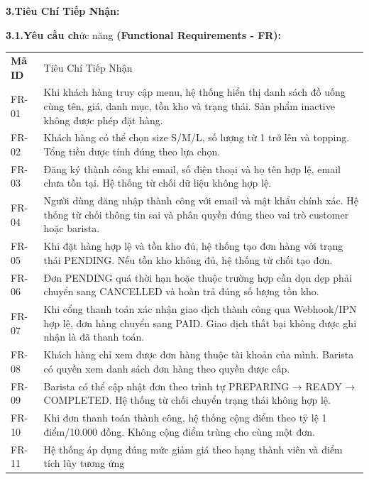 \documentclass[
]{article}
\begin{document}
\textbf{3.Tiêu Chí Tiếp Nhận:}

\textbf{3.1.Yêu cầu ch}ức năng \textbf{(Functional Requirements - FR):}

\begin{longtable}[]{@{}
  >{\raggedright\arraybackslash}p{}
  >{\raggedright\arraybackslash}p{}@{}}
\toprule\noalign{}
\endhead
\bottomrule\noalign{}
\endlastfoot
\textbf{Mã ID} & Tiêu Chí Tiếp Nhận \\
FR-01 & Khi khách hàng truy cập menu, hệ thống hiển thị danh sách đồ uống cùng tên, giá, danh mục, tồn kho và trạng thái. Sản phẩm inactive không được phép đặt hàng. \\
FR-02 & Khách hàng có thể chọn size S/M/L, số lượng từ 1 trở lên và topping. Tổng tiền được tính đúng theo lựa chọn. \\
FR-03 & Đăng ký thành công khi email, số điện thoại và họ tên hợp lệ, email chưa tồn tại. Hệ thống từ chối dữ liệu không hợp lệ. \\
FR-04 & Người dùng đăng nhập thành công với email và mật khẩu chính xác. Hệ thống từ chối thông tin sai và phân quyền đúng theo vai trò customer hoặc barista. \\
FR-05 & Khi đặt hàng hợp lệ và tồn kho đủ, hệ thống tạo đơn hàng với trạng thái PENDING. Nếu tồn kho không đủ, hệ thống từ chối tạo đơn. \\
FR-06 & Đơn PENDING quá thời hạn hoặc thuộc trường hợp cần dọn dẹp phải chuyển sang CANCELLED và hoàn trả đúng số lượng tồn kho. \\
FR-07 & Khi cổng thanh toán xác nhận giao dịch thành công qua Webhook/IPN hợp lệ, đơn hàng chuyển sang PAID. Giao dịch thất bại không được ghi nhận là đã thanh toán. \\
FR-08 & Khách hàng chỉ xem được đơn hàng thuộc tài khoản của mình. Barista có quyền xem danh sách đơn hàng theo quyền được cấp. \\
FR-09 & Barista có thể cập nhật đơn theo trình tự PREPARING → READY → COMPLETED. Hệ thống từ chối chuyển trạng thái không hợp lệ. \\
FR-10 & Khi đơn thanh toán thành công, hệ thống cộng điểm theo tỷ lệ 1 điểm/10.000 đồng. Không cộng điểm trùng cho cùng một đơn. \\
FR-11 & Hệ thống áp dụng đúng mức giảm giá theo hạng thành viên và điểm tích lũy tương ứng \\
\end{longtable}
\end{document}
